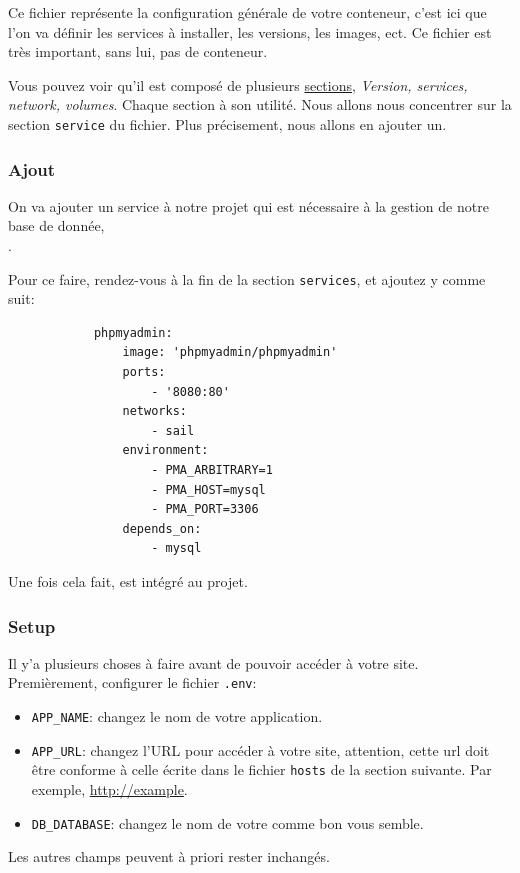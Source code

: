         Ce fichier représente la configuration générale de votre conteneur, c'est ici que l'on va définir les services à installer, les versions, les images, ect.
        Ce fichier est très important, sans lui, pas de conteneur.

        Vous pouvez voir qu'il est composé de plusieurs \href{https://docs.docker.com/compose/compose-file/}{sections}, \textit{Version, services, network, volumes}. Chaque section à son utilité. Nous allons nous concentrer sur la section \verb|service| du fichier. Plus précisement, nous allons en ajouter un.


    \subsubsection[Ajout PhpMyAdmin]{Ajout \phpmyadmin{}}

        On va ajouter un service à notre projet qui est nécessaire à la gestion de notre base de donnée,\\ \phpmyadmin{}.
        
        Pour ce faire, rendez-vous à la fin de la section \verb|services|, et ajoutez y \phpmyadmin{} comme suit:

        \begin{lstlisting}
            phpmyadmin:
                image: 'phpmyadmin/phpmyadmin'
                ports:
                    - '8080:80'
                networks:
                    - sail
                environment:
                    - PMA_ARBITRARY=1
                    - PMA_HOST=mysql
                    - PMA_PORT=3306
                depends_on:
                    - mysql
        \end{lstlisting}

        Une fois cela fait, \phpmyadmin{} est intégré au projet.

        \subsubsection[Setup]{Setup}
        Il y'a plusieurs choses à faire avant de pouvoir accéder à votre site. Premièrement, configurer le fichier \verb|.env|:

        \begin{itemize}
            \item \verb|APP_NAME|: changez le nom de votre application.
            \item \verb|APP_URL|: changez l'URL pour accéder à votre site, attention, cette url doit être conforme à celle écrite dans le fichier \verb|hosts| de la section suivante. Par exemple, \url{http://example}.
            \item \verb|DB_DATABASE|: changez le nom de votre \db{} comme bon vous semble.
        \end{itemize}
        Les autres champs peuvent à priori rester inchangés.

